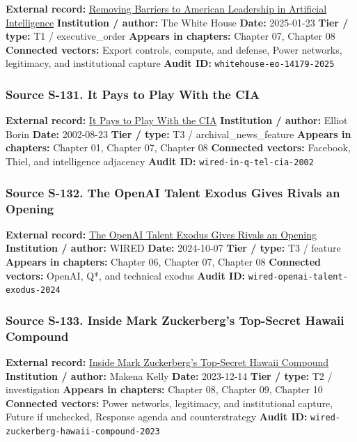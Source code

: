 \documentclass[
  american,
  11pt,
  letterpaper,
]{article}
\begin{document}
\textbf{External record:}
\href{https://www.whitehouse.gov/presidential-actions/2025/01/removing-barriers-to-american-leadership-in-artificial-intelligence/}{Removing
Barriers to American Leadership in Artificial Intelligence}
\textbf{Institution / author:} The White House \textbf{Date:} 2025-01-23
\textbf{Tier / type:} T1 / executive\_order \textbf{Appears in
chapters:} Chapter 07, Chapter 08 \textbf{Connected vectors:} Export
controls, compute, and defense, Power networks, legitimacy, and
institutional capture \textbf{Audit ID:}
\texttt{whitehouse-eo-14179-2025}

\subsubsection{Source S-131. It Pays to Play With the
CIA}\label{source-s-131-it-pays-to-play-with-the-cia}

\textbf{External record:}
\href{https://www.wired.com/2002/08/it-pays-to-play-with-the-cia/}{It
Pays to Play With the CIA} \textbf{Institution / author:} Elliot Borin
\textbf{Date:} 2002-08-23 \textbf{Tier / type:} T3 /
archival\_news\_feature \textbf{Appears in chapters:} Chapter 01,
Chapter 07, Chapter 08 \textbf{Connected vectors:} Facebook, Thiel, and
intelligence adjacency \textbf{Audit ID:}
\texttt{wired-in-q-tel-cia-2002}

\subsubsection{Source S-132. The OpenAI Talent Exodus Gives Rivals an
Opening}\label{source-s-132-the-openai-talent-exodus-gives-rivals-an-opening}

\textbf{External record:}
\href{https://www.wired.com/story/openai-departures-research-rivals-artificial-intelligence}{The
OpenAI Talent Exodus Gives Rivals an Opening} \textbf{Institution /
author:} WIRED \textbf{Date:} 2024-10-07 \textbf{Tier / type:} T3 /
feature \textbf{Appears in chapters:} Chapter 06, Chapter 07, Chapter 08
\textbf{Connected vectors:} OpenAI, Q*, and technical exodus
\textbf{Audit ID:} \texttt{wired-openai-talent-exodus-2024}

\subsubsection{Source S-133. Inside Mark Zuckerberg's Top-Secret Hawaii
Compound}\label{source-s-133-inside-mark-zuckerbergs-top-secret-hawaii-compound}

\textbf{External record:}
\href{https://www.wired.com/story/mark-zuckerberg-inside-hawaii-compound}{Inside
Mark Zuckerberg's Top-Secret Hawaii Compound} \textbf{Institution /
author:} Makena Kelly \textbf{Date:} 2023-12-14 \textbf{Tier / type:} T2
/ investigation \textbf{Appears in chapters:} Chapter 08, Chapter 09,
Chapter 10 \textbf{Connected vectors:} Power networks, legitimacy, and
institutional capture, Future if unchecked, Response agenda and
counterstrategy \textbf{Audit ID:}
\texttt{wired-zuckerberg-hawaii-compound-2023}
\end{document}
